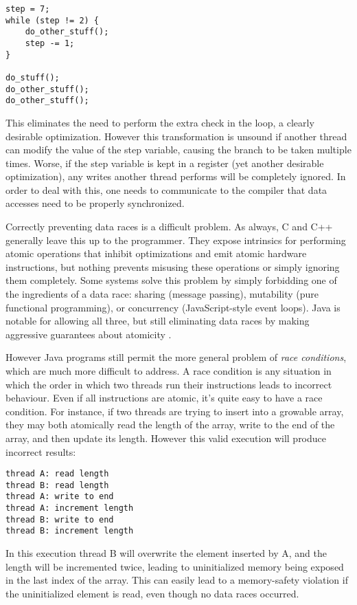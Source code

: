 \begin{verbatim}
step = 7;
while (step != 2) {
    do_other_stuff();
    step -= 1;
}

do_stuff();
do_other_stuff();
do_other_stuff();
\end{verbatim}

This eliminates the need to perform the extra check in the loop, a clearly
desirable optimization. However this transformation is unsound if another
thread can modify the value of the step variable, causing the branch to be
taken multiple times. Worse, if the step variable is kept in a register
(yet another desirable optimization), any writes another thread performs
will be completely ignored. In order to deal with this, one needs to
communicate to the compiler that data accesses need to be properly synchronized.

Correctly preventing data races is a difficult problem. As always,
C and C++ generally leave this up to the programmer. They expose intrinsics for
performing atomic operations that inhibit optimizations and emit atomic hardware
instructions, but nothing prevents misusing these operations or simply ignoring
them completely. Some systems solve this problem by simply forbidding one
of the ingredients of a data race: sharing (message passing), mutability
(pure functional programming), or concurrency (JavaScript-style event loops).
Java is notable for allowing all three, but still eliminating data races by
making aggressive guarantees about atomicity \cite{aspinall2007formalising}.

However Java programs still permit the more general problem of
\emph{race conditions}, which are much more difficult to address. A race condition
is any situation in which the order in which two threads run their instructions
leads to incorrect behaviour. Even if all instructions are atomic, it's quite easy
to have a race condition. For instance, if two threads are trying to insert into
a growable array, they may both atomically read the length of the array,
write to the end of the array, and then update its length. However this valid
execution will produce incorrect results:

\begin{verbatim}
thread A: read length
thread B: read length
thread A: write to end
thread A: increment length
thread B: write to end
thread B: increment length
\end{verbatim}

In this execution thread B will overwrite the element inserted by A, and the length
will be incremented twice, leading to uninitialized memory being exposed in the last
index of the array. This can easily lead to a memory-safety violation if the
uninitialized element is read, even though no data races occurred.





